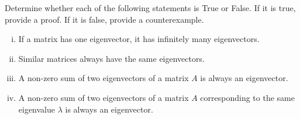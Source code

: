 \begin{question}
\normalfont
Determine whether each of the following statements is True or False. If it is true, provide a proof. If it is false, provide a counterexample. 
\begin{enumerate}[(i)]

\item If a matrix has one eigenvector, it has infinitely many eigenvectors.

\item Similar matrices always have the same eigenvectors.

\item A non-zero sum of two eigenvectors of a matrix $A$ is always an eigenvector.

\item A non-zero sum of two eigenvectors of a matrix $A$ corresponding to the same eigenvalue $\lambda$ is always an eigenvector. 

\end{enumerate}

\end{question}